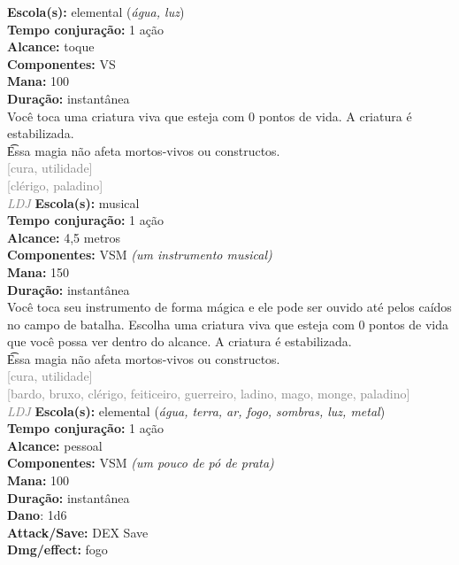 \documentclass{RPG_Adventure}[2021/10/20]
\begin{document}
{\small \t \textbf{Escola(s):} elemental (\textit{água, luz})\\\t \textbf{Tempo conjuração:} 1 ação\\\t \textbf{Alcance:} toque\\\t \textbf{Componentes:} VS\\\t \textbf{Mana:} 100\\\t \textbf{Duração:} instantânea\\}
{\normalsize Você toca uma criatura viva que esteja com 0 pontos de vida. A criatura é estabilizada.\\\t Essa magia não afeta mortos-vivos ou constructos.\\}
{\scriptsize \textcolor{gray}{[cura, utilidade]\\}}
{\scriptsize \textcolor{gray}{[clérigo, paladino]\\}}
{\tiny \textcolor{gray}{\textit{LDJ}}}
{\small \t \textbf{Escola(s):} musical\\\t \textbf{Tempo conjuração:} 1 ação\\\t \textbf{Alcance:} 4,5 metros\\\t \textbf{Componentes:} VSM \textit{(um instrumento musical)}\\\t \textbf{Mana:} 150\\\t \textbf{Duração:} instantânea\\}
{\normalsize Você toca seu instrumento de forma mágica e ele pode ser ouvido até pelos caídos no campo de batalha. Escolha uma criatura viva que esteja com 0 pontos de vida que você possa ver dentro do alcance. A criatura é estabilizada.\\\t Essa magia não afeta mortos-vivos ou constructos.\\}
{\scriptsize \textcolor{gray}{[cura, utilidade]\\}}
{\scriptsize \textcolor{gray}{[bardo, bruxo, clérigo, feiticeiro, guerreiro, ladino, mago, monge, paladino]\\}}
{\tiny \textcolor{gray}{\textit{LDJ}}}
{\small \t \textbf{Escola(s):} elemental (\textit{água, terra, ar, fogo, sombras, luz, metal})\\\t \textbf{Tempo conjuração:} 1 ação\\\t \textbf{Alcance:} pessoal\\\t \textbf{Componentes:} VSM \textit{(um pouco de pó de prata)}\\\t \textbf{Mana:} 100\\\t \textbf{Duração:} instantânea\\\t \textbf{Dano}: 1d6\\\t \textbf{Attack/Save:} DEX Save\\\t \textbf{Dmg/effect:} fogo\\}
\end{document}
